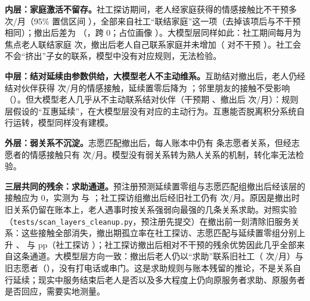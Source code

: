\documentclass[10.5pt,twocolumn]{ctexart}
\begin{document}
\textbf{内层：家庭激活不留存。}社工探访期间，老人经家庭获得的情感接触比不干预多 \LyCActIv{} 次/月（95\% 置信区间 \LyCActIvCI），全部来自社工``联结家庭''这一项（去掉该项后与不干预相同）；撤出后差为 \LyCActPost（\LyCActPostCI，跨 0；占位画像 \LyCActPostPh）。大模型层同样如此：社工期间每月为焦点老人联结家庭 \LyLlmLinkIv{} 次，撤出后老人自己联系家庭并未增加（\LyLlmCwFamPost{} 对不干预 \LyLlmNoneFamPost）。社工会不会``挤出''子女的联系，模型中没有对应规则，无法检验。

\textbf{中层：结对延续由参数供给，大模型老人不主动维系。}互助结对撤出后，老人仍经结对伙伴获得 \LyTbPairPost{} 次/月的情感接触，延续置零后降为 \LyTbZeroPairPost；邻里朋友的接触不受影响（\LyCPeerPost）。但大模型老人几乎从不主动联系结对伙伴（干预期 \LyLlmTbPairIv、撤出后 \LyLlmTbPairPost{} 次/月）：规则层假设的``互惠延续''，在大模型层没有对应的主动行为。互惠能否脱离积分系统自行运转，模型同样没有建模。

\textbf{外层：弱关系不沉淀。}志愿匹配撤出后，每人账本中仍有 \LyVolTiesPost{} 条志愿者关系，但经志愿者的情感接触只有 \LyPfVolPost{} 次/月。模型没有弱关系转为熟人关系的机制，转化率无法检验。

\textbf{三层共同的残余：求助通道。}预注册预测延续置零组与志愿匹配组撤出后经该层的接触应为 0，实测为 \LyTbZeroPairPost{} 与 \LyPfVolPost；社工探访组撤出后经旧社工仍有 \LyCwSwPost{} 次/月。原因是撤出时旧关系仍留在账本上，老人遇事时按关系强弱向最强的几条关系求助。对照实验（\texttt{tests/scan\_layers\_cleanup.py}，预注册先提交）在撤出前一刻清除旧服务关系：这些接触全部消失，撤出期孤立率在社工探访、志愿匹配与延续置零组分别上升 \LyCleanCwIso、\LyCleanPfIso{} 与 \LyCleanTbZeroIso{} pp（社工探访 \LyCleanCwIsoCI）；社工探访撤出后相对不干预的残余优势因此几乎全部来自这条通道。大模型层方向一致：撤出后老人仍以``求助''联系旧社工（\LyLlmCwSwPost{} 次/月）与旧志愿者（\LyLlmPfVolPost），没有打电话或串门。这是求助规则与账本残留的推论，不是关系自行延续；现实中服务结束后老人是否以及多大程度上仍向原服务者求助、原服务者是否回应，需要实地测量。
\end{document}
